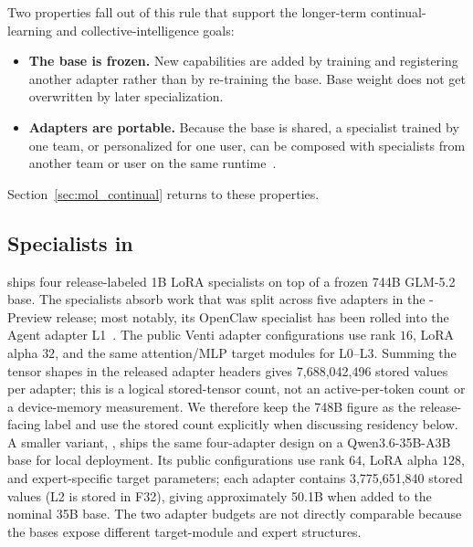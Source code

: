 Two properties fall out of this rule that support the longer-term continual-learning and collective-intelligence goals:
\begin{itemize}[leftmargin=*]
  \item \textbf{The base is frozen.} New capabilities are added by training and registering another adapter rather than by re-training the base. Base weight does not get overwritten by later specialization.
  \item \textbf{Adapters are portable.} Because the base is shared, a specialist trained by one team, or personalized for one user, can be composed with specialists from another team or user on the same runtime~\citep{macaron_v1_blog2026}.
\end{itemize}
Section~\ref{sec:mol_continual} returns to these properties.

\subsection{Specialists in \venti}
\label{sec:mol_specialists}

\venti{} ships four release-labeled 1B LoRA specialists on top of a frozen 744B GLM-5.2~\citep{glm52_2026,glm5_2026} base. The specialists absorb work that was split across five adapters in the \macaron{}-Preview release; most notably, its OpenClaw specialist has been rolled into the Agent adapter L1~\citep{macaron_v1_preview2026,macaron_v1_blog2026}. The public Venti adapter configurations use rank $16$, LoRA alpha $32$, and the same attention/MLP target modules for L0--L3. Summing the tensor shapes in the released adapter headers gives 7,688,042,496 stored values per adapter; this is a logical stored-tensor count, not an active-per-token count or a device-memory measurement. We therefore keep the 748B figure as the release-facing label and use the stored count explicitly when discussing residency below. A smaller variant, \tall, ships the same four-adapter design on a Qwen3.6-35B-A3B~\citep{qwen36_2026,qwen3_2025} base for local deployment. Its public configurations use rank $64$, LoRA alpha $128$, and expert-specific target parameters; each adapter contains 3,775,651,840 stored values (L2 is stored in F32), giving approximately 50.1B when added to the nominal 35B base. The two adapter budgets are not directly comparable because the bases expose different target-module and expert structures.

